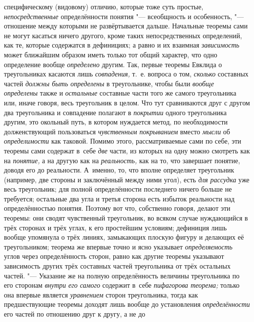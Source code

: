специфическому (видовому) отличию, которые тоже суть простые,
{\em непосредственные}
определённости понятия "--- всеобщность и
особенность, "--- отношение между которыми не развёртывается
дальше. Начальные теоремы сами не могут касаться ничего другого, кроме
таких непосредственных определений, как те, которые содержатся в
дефинициях; а равно и их взаимная
{\em зависимость} может
ближайшим образом иметь только тот общий характер, что одно определение
вообще {\em определено}
другим. Так, первые теоремы Евклида о треугольниках касаются
лишь {\em совпадения,}
т.~е. вопроса о том,
{\em сколько} составных
частей {\em должны быть определены}
в треугольнике, чтобы были
{\em вообще определены}
также и {\em остальные}
составные части того же самого треугольника или, иначе
говоря, весь треугольник в целом. Что тут сравниваются друг с другом два
треугольника и совпадение полагают в
{\em покрытии} одного
треугольника другим, это окольный путь, в котором нуждается метод, по
необходимости долженствующий пользоваться
{\em чувственным покрыванием}
вместо {\em мысли}
об {\em определимости}
как таковой. Помимо этого, рассматриваемые сами по себе, эти
теоремы сами содержат в~себе {\em две}
части, из которых на одну можно смотреть как на
{\em понятие,} а на
другую как на {\em реальность,}
как на то, что завершает понятие, доводя его до реальности.
А~именно, то, что вполне определяет треугольник (например, две стороны и
заключённый между ними угол), есть
{\em для рассудка} уже
весь треугольник; для полной определённости последнего ничего больше не
требуется; остальные два угла и третья сторона есть избыток реальности над
определённостью понятия. Поэтому вот что, собственно говоря,
делают эти теоремы: они сводят чувственный треугольник, во всяком случае
нуждающийся в трёх сторонах и трёх углах, к его простейшим условиям;
дефиниция лишь вообще упомянула о трёх линиях, замыкающих плоскую фигуру и
делающих её треугольником; теорема же впервые точно и ясно указывает
{\em определяемость}
углов через определённость сторон, равно как другие теоремы
указывают зависимость других трёх составных частей треугольника от трёх
остальных частей. "--- Указание же на полную определённость
величины треугольника по его сторонам
{\em внутри его самого}
содержит в~себе
{\em пифагорова теорема;}
только она впервые является
{\em уравнением} сторон
треугольника, тогда как предшествующие
теоремы
доходят лишь вообще до установления
{\em определённости} его
частей по отношению друг к другу, а не до
